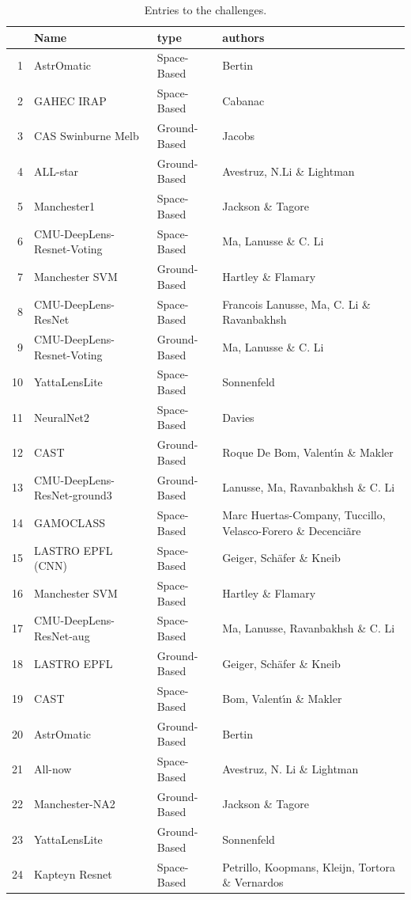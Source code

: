 \documentclass[useAMS,usenatbib]{mnras}
\begin{document}
\begin{table}
\centering
\begin{tabular}{rlll}
  \hline
 & Name & type & authors \\ 
  \hline
  1 & AstrOmatic & Space-Based & Bertin   \\ 
  2 & GAHEC IRAP & Space-Based & Cabanac  \\ 
  3 & CAS Swinburne Melb & Ground-Based & Jacobs   \\ 
  4 & ALL-star & Ground-Based & Avestruz, N.Li \& Lightman  \\ 
  5 & Manchester1 & Space-Based & Jackson \& Tagore  \\ 
  6 & CMU-DeepLens-Resnet-Voting & Space-Based & Ma, Lanusse \& C. Li  \\ 
  7 & Manchester SVM & Ground-Based & Hartley \& Flamary  \\ 
  8 & CMU-DeepLens-ResNet & Space-Based & Francois Lanusse, Ma, C. Li \& Ravanbakhsh \\ 
  9 & CMU-DeepLens-Resnet-Voting & Ground-Based & Ma, Lanusse \& C. Li   \\ 
  10 & YattaLensLite & Space-Based &  Sonnenfeld  \\ 
  11 & NeuralNet2 & Space-Based &  Davies  \\ 
  12 & CAST & Ground-Based &  Roque De Bom, Valent\'{\i}n \&  Makler  \\ 
  13 & CMU-DeepLens-ResNet-ground3 & Ground-Based &  Lanusse, Ma, Ravanbakhsh \& C. Li \\ 
  14 & GAMOCLASS & Space-Based & Marc Huertas-Company, Tuccillo, Velasco-Forero \& Decenci\~{a}re \\ 
  15 & LASTRO EPFL (CNN) & Space-Based & Geiger, Sch\"{a}fer \& Kneib \\ 
  16 & Manchester SVM & Space-Based &  Hartley  \& Flamary\\ 
  17 & CMU-DeepLens-ResNet-aug & Space-Based & Ma,  Lanusse, Ravanbakhsh \& C. Li \\ 
  18 & LASTRO EPFL & Ground-Based & Geiger, Sch\"{a}fer \& Kneib   \\ 
  19 & CAST & Space-Based & Bom, Valent\'{\i}n \& Makler  \\ 
  20 & AstrOmatic & Ground-Based & Bertin  \\ 
  21 & All-now & Space-Based & Avestruz, N. Li \& Lightman   \\ 
  22 & Manchester-NA2 & Ground-Based & Jackson \& Tagore  \\ 
  23 & YattaLensLite & Ground-Based & Sonnenfeld   \\ 
  24 & Kapteyn Resnet & Space-Based & Petrillo, Koopmans, Kleijn, Tortora \& Vernardos \\ 
   \hline
\end{tabular}
\caption{Entries to the challenges.}
\label{table:entries}
\end{table}
\end{document}
